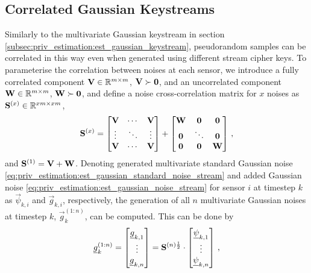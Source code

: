 \subsection{Correlated Gaussian Keystreams}\label{subsec:priv_estimation:fus_gaussian_keystreams}
Similarly to the multivariate Gaussian keystream in section \ref{subsec:priv_estimation:est_gaussian_keystream}, pseudorandom samples can be correlated in this way even when generated using different stream cipher keys. To parameterise the correlation between noises at each sensor, we introduce a fully correlated component ${{\mathbf{V}}}\in\mathbb{R}^{m\times m}$, ${{\mathbf{V}}}\succ{\ensuremath{{\mathbf{0}}}}$, and an uncorrelated component ${{\mathbf{W}}}\in\mathbb{R}^{m\times m}$, ${{\mathbf{W}}}\succ{\ensuremath{{\mathbf{0}}}}$, and define a noise cross-correlation matrix for $x$ noises as ${{\mathbf{S}}}^{(x)} \in \mathbb{R}^{xm\times xm}$,
\begin{equation}\label{eq:priv_estimation:fus_noise_correlation_matrix}
    {\ensuremath{{\mathbf{S}}}}^{(x)}=
    \begin{bmatrix}
        {\ensuremath{{\mathbf{V}}}} & \cdots & {{\mathbf{V}}}\\
        \vdots & \ddots & \vdots\\
        {{\mathbf{V}}} & \cdots & {{\mathbf{V}}}\\
    \end{bmatrix}+
    \begin{bmatrix}
        {\ensuremath{{\mathbf{W}}}} & {{\mathbf{0}}} & {{\mathbf{0}}}\\
        {{\mathbf{0}}} & \ddots & {{\mathbf{0}}}\\
        {{\mathbf{0}}} & {{\mathbf{0}}} & {{\mathbf{W}}}\\
    \end{bmatrix}\,,
\end{equation}
and ${{\mathbf{S}}}^{(1)}={{\mathbf{V}}}+{{\mathbf{W}}}$. Denoting generated multivariate standard Gaussian noise \eqref{eq:priv_estimation:est_gaussian_standard_noise_stream} and added Gaussian noise \eqref{eq:priv_estimation:est_gaussian_noise_stream} for sensor $i$ at timestep $k$ as $\vec{\psi}_{k, i}$ and $\vec{g}_{k, i}$, respectively, the generation of all $n$ multivariate Gaussian noises at timestep $k$, $\vec{g}_k^{(1:n)}$, can be computed. This can be done by
\begin{equation}\label{eq:priv_estimation:fus_all_correlated_noises_generation}
    {\underline{g}}_k^{(1:n)}=
    \begin{bmatrix}
        {\underline{g}}_{k,1}\\
        \vdots\\
        {\underline{g}}_{k,n}
    \end{bmatrix}=
    {{\mathbf{S}}}^{(n)\frac{1}{2}}\cdot
    \begin{bmatrix}
        {\underline{\psi}}_{k,1}\\
        \vdots\\
        {\underline{\psi}}_{k,n}
    \end{bmatrix}\,,
\end{equation}
